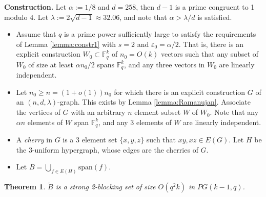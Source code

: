 \documentclass[11pt]{article}
\theoremstyle{plain}
\newtheorem{theorem}{Theorem}
\theoremstyle{definition}
\begin{document}
\noindent
\textbf{Construction.} Let $\alpha:=1/8$ and $d=258$, then $d-1$ is a prime congruent to 1 modulo 4. Let $\lambda:=2\sqrt{d-1}\approx 32.06$, and note that $\alpha>\lambda/d$ is satisfied.
\begin{itemize}
    \item Assume that $q$ is a prime power sufficiently large to satisfy the requirements of Lemma \ref{lemma:constr1} with $s=2$ and $\varepsilon_0=\alpha/2$. That is, there is an explicit construction  $W_0\subset \mathbb{F}_q^k$ of $n_0=O(k)$ vectors such that any subset of $W_0$ of size at least $\alpha n_0/2$ spans $\mathbb{F}_q^k$, and any three vectors in $W_0$ are linearly independent.
    
    \item Let $n_0\geq n=(1+o(1))n_0$ for which there is an explicit construction $G$ of an $(n,d,\lambda)$-graph. This exists by Lemma \ref{lemma:Ramanujan}. Associate the vertices of $G$ with an arbitrary $n$ element subset $W$ of $W_0$. Note that 
    any $\alpha n$ elements of $W$ span $\mathbb{F}_q^k$, and any $3$ elements of $W$ are linearly independent.
    
    \item A \emph{cherry} in $G$ is a 3 element set $\{x,y,z\}$ such that $xy,xz\in E(G)$. Let $H$ be the 3-uniform hypergraph, whose edges are the cherries of $G$.

    \item  Let $B=\bigcup_{f\in E(H)}\mbox{span}(f)$.
\end{itemize}   

\begin{theorem}
$\tilde{B}$ is a strong 2-blocking set of size $O(q^2 k)$ in $PG(k-1,q)$.
\end{theorem}
\end{document}
